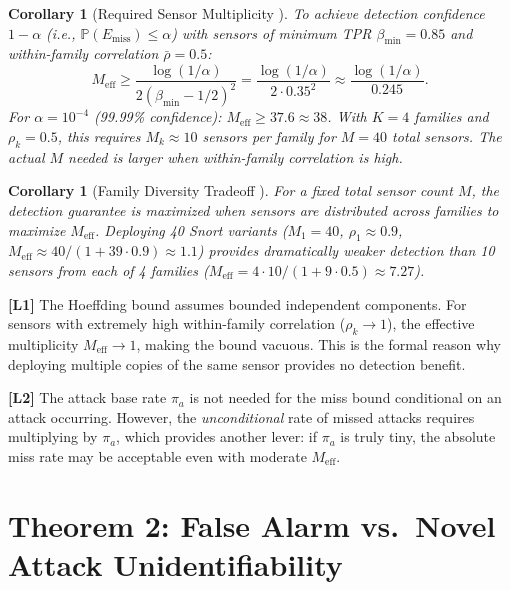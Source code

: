 \documentclass[11pt,a4paper]{article}
\newtheorem{corollary}[theorem]{Corollary}
\theoremstyle{definition}
\theoremstyle{remark}
\newcommand{\limitationTag}[1]{\textsf{\textbf{[L#1]}}}
\newcommand{\Pbb}{\mathbb{P}}
\begin{document}
\begin{corollary}[Required Sensor Multiplicity ]
\label{cor:required_M}
To achieve detection confidence $1 - \alpha$ (i.e., $\Pbb(E_{\mathrm{miss}}) \leq \alpha$) with sensors of minimum TPR $\beta_{\min} = 0.85$ and within-family correlation $\bar{\rho} = 0.5$:
\begin{equation}
M_{\mathrm{eff}} \geq \frac{\log(1/\alpha)}{2 (\beta_{\min} - 1/2)^2} = \frac{\log(1/\alpha)}{2 \cdot 0.35^2} \approx \frac{\log(1/\alpha)}{0.245}.
\label{eq:Meff_required}
\end{equation}
For $\alpha = 10^{-4}$ (99.99\% confidence): $M_{\mathrm{eff}} \geq 37.6 \approx 38$. With $K = 4$ families and $\rho_k = 0.5$, this requires $M_k \approx 10$ sensors per family for $M = 40$ total sensors. The actual $M$ needed is larger when within-family correlation is high.
\end{corollary}

\begin{corollary}[Family Diversity Tradeoff ]
\label{cor:diversity}
For a fixed total sensor count $M$, the detection guarantee is maximized when sensors are distributed across families to maximize $M_{\mathrm{eff}}$. Deploying 40 Snort variants ($M_1 = 40$, $\rho_1 \approx 0.9$, $M_{\mathrm{eff}} \approx 40 / (1 + 39 \cdot 0.9) \approx 1.1$) provides dramatically weaker detection than 10 sensors from each of 4 families ($M_{\mathrm{eff}} = 4 \cdot 10 / (1 + 9 \cdot 0.5) \approx 7.27$).
\end{corollary}

\limitationTag{1} The Hoeffding bound assumes bounded independent components. For sensors with extremely high within-family correlation ($\rho_k \to 1$), the effective multiplicity $M_{\mathrm{eff}} \to 1$, making the bound vacuous. This is the formal reason why deploying multiple copies of the same sensor provides no detection benefit.

\limitationTag{2} The attack base rate $\pi_a$ is not needed for the miss bound conditional on an attack occurring. However, the \textit{unconditional} rate of missed attacks requires multiplying by $\pi_a$, which provides another lever: if $\pi_a$ is truly tiny, the absolute miss rate may be acceptable even with moderate $M_{\mathrm{eff}}$.

\section{Theorem 2: False Alarm vs.\ Novel Attack Unidentifiability }
\label{sec:theorem2}
\end{document}
